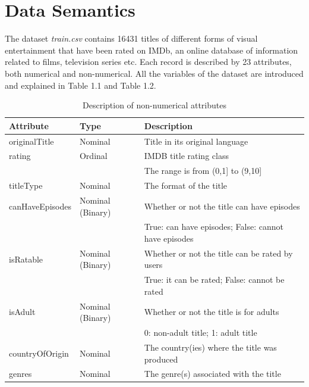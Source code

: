 \section{Data Semantics}\label{sec:data_semantics}
The dataset \textit{train.csv} contains 16431 titles of different forms of visual entertainment that have been rated on IMDb, an online database of information related to films, television series etc. 
Each record is described by 23 attributes, both numerical and non-numerical. 
All the variables of the dataset are introduced and explained in Table 1.1 and Table 1.2.
\begin{table}[h]
    \centering
    \begin{tabular}{|l|l|l|} %
        \hline
        \textbf{Attribute} & \textbf{Type} & \textbf{Description} \\ 
        \hline
        originalTitle & Nominal & Title in its original language \\  
        \hline
        rating & Ordinal & IMDB title rating class \\
        & & The range is from (0,1] to (9,10] \\ 
        \hline
        titleType & Nominal & The format of the title \\ 
        \hline
        canHaveEpisodes & Nominal (Binary) & Whether or not the title can have episodes \\ 
        & & True: can have episodes; False: cannot have episodes \\ 
        \hline
        isRatable & Nominal (Binary) & Whether or not the title can be rated by users \\ 
        & & True: it can be rated; False: cannot be rated \\ 
        \hline
        isAdult & Nominal (Binary) & Whether or not the title is for adults \\ 
        & & 0: non-adult title; 1: adult title \\ 
        \hline
        countryOfOrigin & Nominal & The country(ies) where the title was produced \\ 
        \hline
        genres & Nominal & The genre(s) associated with the title \\ 
        \hline
    \end{tabular}
    \caption{Description of non-numerical attributes}
    \label{tab:attributes}
\end{table}

